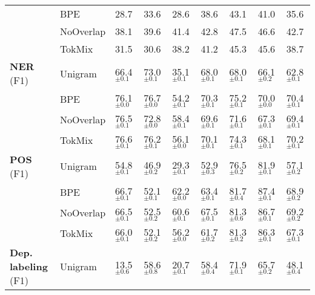 \begin{table*}
\begin{tabular}{lllllllll}
     & BPE &              28.7 &              33.6 &              28.6 &              38.6 &              43.1 &              41.0 &              35.6 \\
     & NoOverlap &              38.1 &              39.6 &              41.4 &              42.8 &              47.5 &              46.6 &              42.7 \\
     & TokMix &              31.5 &              30.6 &              38.2 &              41.2 &              45.3 &              45.6 &              38.7 \\
\cline{1-9}
\multirowcell{4}[0pt][l]{\textbf{NER} \\ (F1)} & Unigram &  66.4 $_{\pm0.1}$ &  73.0 $_{\pm0.1}$ &  35.1 $_{\pm0.1}$ &  68.0 $_{\pm0.1}$ &  68.0 $_{\pm0.1}$ &  66.1 $_{\pm0.2}$ &  62.8 $_{\pm0.1}$ \\
     & BPE &  76.1 $_{\pm0.0}$ &  76.7 $_{\pm0.0}$ &  54.2 $_{\pm0.1}$ &  70.3 $_{\pm0.1}$ &  75.2 $_{\pm0.1}$ &  70.0 $_{\pm0.0}$ &  70.4 $_{\pm0.1}$ \\
     & NoOverlap &  76.5 $_{\pm0.1}$ &  72.8 $_{\pm0.0}$ &  58.4 $_{\pm0.1}$ &  69.6 $_{\pm0.1}$ &  71.6 $_{\pm0.1}$ &  67.3 $_{\pm0.1}$ &  69.4 $_{\pm0.1}$ \\
     & TokMix &  76.6 $_{\pm0.1}$ &  76.2 $_{\pm0.1}$ &  56.1 $_{\pm0.0}$ &  70.1 $_{\pm0.1}$ &  74.3 $_{\pm0.1}$ &  68.1 $_{\pm0.1}$ &  70.2 $_{\pm0.1}$ \\
\cline{1-9}
\multirowcell{4}[0pt][l]{\textbf{POS} \\ (F1)} & Unigram &  54.8 $_{\pm0.1}$ &  46.9 $_{\pm0.2}$ &  29.3 $_{\pm0.1}$ &  52.9 $_{\pm0.3}$ &  76.5 $_{\pm0.2}$ &  81.9 $_{\pm0.1}$ &  57.1 $_{\pm0.2}$ \\
     & BPE &  66.7 $_{\pm0.1}$ &  52.1 $_{\pm0.1}$ &  62.2 $_{\pm0.0}$ &  63.4 $_{\pm0.1}$ &  81.7 $_{\pm0.4}$ &  87.4 $_{\pm0.1}$ &  68.9 $_{\pm0.2}$ \\
     & NoOverlap &  66.5 $_{\pm0.1}$ &  52.5 $_{\pm0.2}$ &  60.6 $_{\pm0.1}$ &  67.5 $_{\pm0.1}$ &  81.3 $_{\pm0.6}$ &  86.7 $_{\pm0.1}$ &  69.2 $_{\pm0.2}$ \\
     & TokMix &  66.0 $_{\pm0.1}$ &  52.1 $_{\pm0.2}$ &  56.2 $_{\pm0.0}$ &  61.7 $_{\pm0.2}$ &  81.3 $_{\pm0.2}$ &  86.3 $_{\pm0.1}$ &  67.3 $_{\pm0.1}$ \\
\cline{1-9}
\multirowcell{4}[0pt][l]{\textbf{Dep. labeling} \\ (F1)} & Unigram &  13.5 $_{\pm0.6}$ &  58.6 $_{\pm0.8}$ &  20.7 $_{\pm0.1}$ &  58.4 $_{\pm0.4}$ &  71.9 $_{\pm0.1}$ &  65.7 $_{\pm0.2}$ &  48.1 $_{\pm0.4}$ \\

\end{tabular}
\end{table*}

